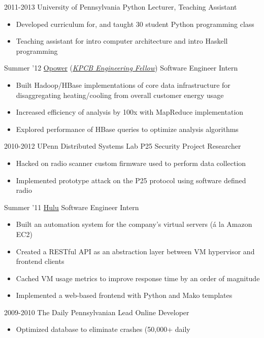 \documentclass[]{wasserman-cv}
\begin{document}
\begin{entrylist}
  \entry
  {2011-2013}
  {University of Pennsylvania}
  {Python Lecturer, Teaching Assistant}
  {\begin{itemize}
    \item Developed curriculum for, and taught 30 student Python programming
      class
    \item Teaching assistant for intro computer architecture and intro Haskell
      programming
    \end{itemize}}
  \entry
  {Summer '12}
  {\href{http://opower.com/}{Opower} (\href{http://kpcbfellows.com/}{\emph{KPCB Engineering Fellow}})}
  {Software Engineer Intern}
  {\begin{itemize}
    \item Built Hadoop/HBase implementations of core data
      infrastructure for disaggregating heating/cooling from overall
      customer energy usage
    \item Increased efficiency of analysis by 100x
      with MapReduce implementation
    \item Explored performance of HBase queries to optimize analysis
      algorithms
    \end{itemize}}
  \entry
  {2010-2012}
  {UPenn Distributed Systems Lab}
  {P25 Security Project Researcher}
  {\begin{itemize}
    \item Hacked on radio scanner custom firmware used to perform
      data collection
    \item Implemented prototype attack on the P25 protocol using
      software defined radio
    \end{itemize}}
  \entry
  {Summer '11}
  {\href{http://hulu.com}{Hulu}}
  {Software Engineer Intern}
  {\begin{itemize}
    \item Built an automation system for the company’s virtual servers
      (\'{a} la Amazon EC2)
    \item Created a RESTful API as an abstraction layer between VM
      hypervisor and frontend clients
    \item Cached VM usage metrics to improve response time by an order
      of magnitude
    \item Implemented a web-based frontend with Python and Mako templates
    \end{itemize}}
  \entry
  {2009-2010}
  {The Daily Pennsylvanian}
  {Lead Online Developer}
  {\begin{itemize}
    \item Optimized database to eliminate crashes (50,000+ daily

\end{itemize}}
\end{entrylist}
\end{document}
